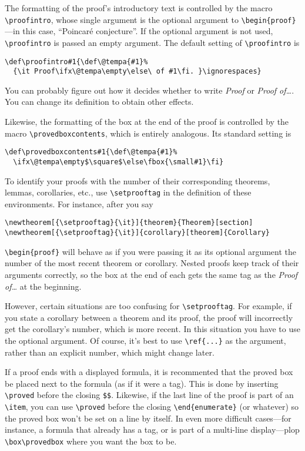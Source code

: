 \begin{wizard}
The formatting of the proof's introductory text is controlled by
the macro \verb+\proofintro+, whose single argument is the optional
argument to \verb+\begin{proof}+---in this case, ``Poincar\'e
conjecture''.  If the optional argument is not used,
\verb+\proofintro+ is passed an empty argument.
The default setting of \verb+\proofintro+ is
%
\begin{verbatim}
\def\proofintro#1{\def\@tempa{#1}%
  {\it Proof\ifx\@tempa\empty\else\ of #1\fi. }\ignorespaces}
\end{verbatim}
%
You can probably figure out how it decides whether to write 
{\it Proof} or {\it Proof of\dots}. You can change its definition to
obtain other effects.  

Likewise, the formatting of the box at the end of the proof is
controlled by the macro \verb+\provedboxcontents+, which is entirely
analogous.  Its standard setting is
\begin{verbatim}
\def\provedboxcontents#1{\def\@tempa{#1}%
  \ifx\@tempa\empty$\square$\else\fbox{\small#1}\fi}
\end{verbatim}
\end{wizard}

To identify your proofs with the number of their corresponding
theorems, lemmas, corollaries, etc., use \verb+\setprooftag+ in the
definition of these environments.  For instance, after you say
%
\begin{verbatim}
\newtheorem[{\setprooftag}{\it}]{theorem}{Theorem}[section]
\newtheorem[{\setprooftag}{\it}]{corollary}[theorem]{Corollary}
\end{verbatim}
%
\verb+\begin{proof}+ will behave as if you were passing it as
its optional argument the number of the most recent theorem or corollary.
Nested proofs keep track of their arguments correctly, so the box at
the end of each gets the same tag as the {\it Proof of\dots} at the
beginning. 

However, certain situations are too confusing for \verb+\setprooftag+.
For example, if you state a corollary between a theorem and its proof,
the proof will incorrectly get the corollary's number, which is more
recent.  In this situation you have to use the optional argument.  Of
course, it's best to use \verb+\ref{...}+ as the argument, rather than
an explicit number, which might change later.

If a proof
ends with a displayed formula, it is recommented that the proved box
be placed next to the formula (as if it were a tag).  This is done
by inserting \verb+\proved+ before the closing \verb+$$+.  
Likewise, if the last line of the proof is part of an \verb+\item+,
you can use \verb+\proved+ before the closing \verb+\end{enumerate}+
(or whatever) so the proved box won't be set on a line by itself.
In even more difficult
cases---for instance, a formula that already has a tag, or is part of a 
multi-line display---plop \verb+\box\provedbox+ where you want the box to be.

